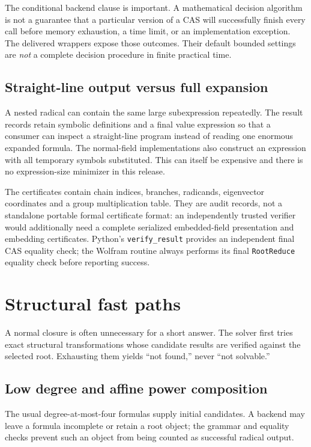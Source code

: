 \documentclass[11pt,a4paper]{article}
\newcommand{\code}[1]{\texttt{\small #1}}
\theoremstyle{definition}
\begin{document}
The conditional backend clause is important. A mathematical decision algorithm
is not a guarantee that a particular version of a CAS will successfully finish
every call before memory exhaustion, a time limit, or an implementation
exception. The delivered wrappers expose those outcomes. Their default bounded
settings are \emph{not} a complete decision procedure in finite practical time.

\subsection{Straight-line output versus full expansion}
A nested radical can contain the same large subexpression repeatedly. The
result records retain symbolic definitions and a final value expression so
that a consumer can inspect a straight-line program instead of reading one
enormous expanded formula. The normal-field implementations also construct
an expression with all temporary symbols substituted. This can itself be
expensive and there is no expression-size minimizer in this release.

The certificates contain chain indices, branches, radicands, eigenvector
coordinates and a group multiplication table. They are audit records, not a
standalone portable formal certificate format: an independently trusted
verifier would additionally need a complete serialized embedded-field
presentation and embedding certificates. Python's \code{verify\_result}
provides an independent final CAS equality check; the Wolfram routine always
performs its final \code{RootReduce} equality check before reporting success.

\section{Structural fast paths}
A normal closure is often unnecessary for a short answer. The solver first
tries exact structural transformations whose candidate results are verified
against the selected root. Exhausting them yields ``not found,'' never
``not solvable.''

\subsection{Low degree and affine power composition}
The usual degree-at-most-four formulas supply initial candidates. A backend
may leave a formula incomplete or retain a root object; the grammar and equality
checks prevent such an object from being counted as successful radical output.
\end{document}
